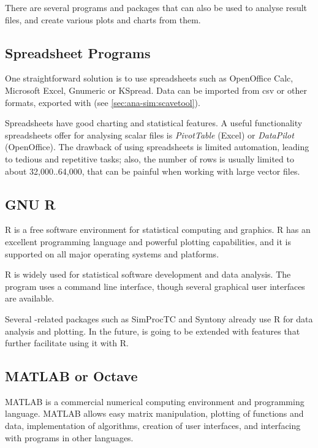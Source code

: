 There are several programs and packages that can also be used to analyse
result files, and create various plots and charts from them.


\subsection{Spreadsheet Programs}

One straightforward solution is to use spreadsheets such as OpenOffice
Calc, Microsoft Excel, Gnumeric or KSpread. Data can be imported from csv
or other formats, exported with  (see
\ref{sec:ana-sim:scavetool}).

Spreadsheets have good charting and statistical features. A useful
functionality spreadsheets offer for analysing scalar files is
\textit{PivotTable} (Excel) or \textit{DataPilot} (OpenOffice). The
drawback of using spreadsheets is limited automation, leading to tedious
and repetitive tasks; also, the number of rows is usually limited to about
32,000..64,000, that can be painful when working with large vector files.


\subsection{GNU R}
\label{sec:ana-sim:gnu-r}

R is a free software environment for statistical computing and graphics.
R has an excellent programming language and powerful plotting capabilities,
and it is supported on all major operating systems and platforms.

R is widely used for statistical software development and data analysis.
The program uses a command line interface, though several graphical user
interfaces are available.

Several {\opp}-related packages such as SimProcTC and Syntony already
use R for data analysis and plotting. In the future, {\opp} is going
to be extended with features that further facilitate using it with R.


\subsection{MATLAB or Octave}

MATLAB is a commercial numerical computing environment and programming language.
MATLAB allows easy matrix manipulation, plotting of functions and data,
implementation of algorithms, creation of user interfaces, and interfacing
with programs in other languages.

